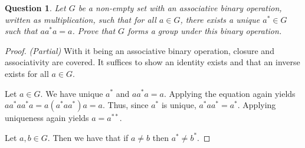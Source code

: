 \documentclass[12pt]{article}
\theoremstyle{customstyle}
\newtheorem{question}{Question}
\begin{document}
\begin{question}
    Let $G$ be a non-empty set with an associative binary operation,
    written as multiplication, such that 
    for all $a \in G$, there exists a unique $a^{*} \in G$ such that $aa^{*}a = a$.
    Prove that $G$ forms a group under this binary operation.
\end{question}
\begin{proof} \textit{(Partial)}
    With it being an associative binary operation, 
    closure and associativity are covered.
    It suffices to show an identity exists and that
    an inverse exists for all $a \in G$.

    Let $a \in G$.
    We have unique $a^{*}$ and $aa^{*}a = a$.
    Applying the equation again yields $aa^{*}aa^{*}a = a(a^{*}aa^{*})a = a$.
    Thus, since $a^{*}$ is unique, $a^{*}aa^{*} = a^{*}$.
    Applying uniqueness again yields $a = a^{**}$.

    Let $a,b \in G$. Then we have that if $a \ne b$ then $a^{*} \ne b^{*}$.
\end{proof}
\end{document}
